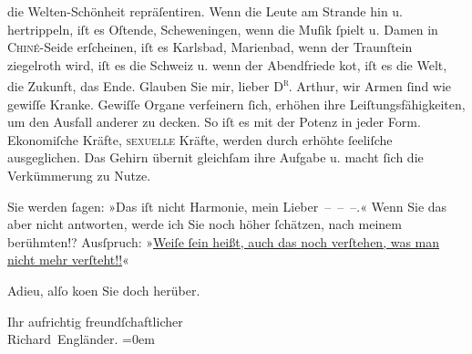                die Welten-Schönheit  repräſentiren. Wenn die Leute
               am Strande hin u. hertrippeln, iſt es Oſtende,
                  Sch\introOben{}e\introOben{}weningen, wenn
               die Muſik ſpielt u. Damen in \textsc{Chiné}-Seide erſcheinen, iſt es
               Karlsbad, Marienbad, wenn der Traunſtein ziegelroth wird, iſt es
               die Schweiz u. wenn der Abendfriede ko{\geminationm}t, iſt  es die  Welt, die Zukunft, \introOben{}das Ende.\introOben{}
               Glauben Sie mir, lieber \textsc{D\textsuperscript{r}}. Arthur, wir Armen ſind wie gewiſſe {\pb}Kranke. Gewiſſe Organe verfeinern ſich, erhöhen ihre Leiſtungsfähigkeiten, um den
               Ausfall anderer zu decken. So iſt es mit der Potenz in jeder Form. Ekonomiſche
               Kräfte, \textsc{sexuelle} Kräfte, werden durch erhöhte ſeeliſche
               ausgeglichen. Das Gehirn überni{\geminationm}t gleichſam ihre Aufgabe
               u. macht ſich die Verkümmerung zu Nutze.\pend
           
\pstart
           Sie werden ſagen: »Das iſt nicht Harmonie, mein Lieber – – –.« {\pb}Wenn Sie das aber nicht antworten, werde
               ich Sie noch höher ſchätzen, nach meinem berühmten\introOben{}!?\introOben{}
               Ausſpruch: »\uline{Weiſe ſein heißt,  auch das noch verſtehen, was man nicht mehr verſteht!!}«\pend
           
\pstart
           Adieu, alſo ko{\geminationm}en Sie doch herüber.\pend
           
\pstart
           Ihr aufrichtig freundſchaftlicher{\\[\baselineskip]}\spacefill\mbox{Richard Engländer.}\pend
           \leftskip=0em{}\endnumbering{}  
      